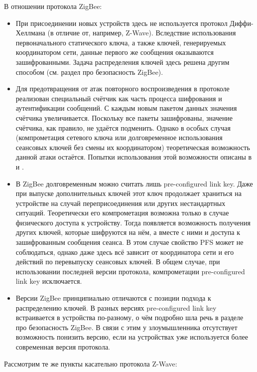 	В отношении протокола ZigBee:
	
	\begin{itemize}
		\item При присоединении новых устройств здесь не используется протокол Диффи-Хеллмана
		(в отличие от, например, Z-Wave). Вследствие использования первоначального статического
		ключа, а также ключей, генерируемых координатором сети, данные первого же сообщения
		оказываются зашифрованными. Задача распределения ключей здесь решена другим способом
		(см. раздел про безопасность ZigBee).
		\item Для предотвращения от атак повторного воспроизведения в протоколе реализован
		специальный счётчик как часть процесса шифрования и аутентификации сообщений. С каждым
		новым пакетом данных значения счётчика увеличивается. Поскольку все пакеты зашифрованы,
		значение счётчика, как правило, не удаётся подменить. Однако в особых случая (компрометация
		сетевого ключа или долговременное использования сеансовых ключей без смены их координатором)
		теоретическая возможность данной атаки остаётся. Попытки использования этой возможности
		описаны в \cite{zigbee-attacks} и \cite{zigbee-security-analysis}.
		\item В ZigBee долговременным можно считать лишь pre-configured link key. Даже при выпуске 
		дополнительных ключей этот ключ продолжает храниться на устройстве на случай переприсоединения 
		или других нестандартных ситуаций. Теоретически его компрометация возможна только в случае
		физического доступа к устройству. Тогда появляется возможность получения других ключей,
		которые шифруются на нём, а вместе с ними и доступа к зашифрованным сообщения сеанса.
		В этом случае свойство PFS может не соблюдаться, однако даже здесь всё зависит от координатора
		сети и его действий по перевыпуску сеансовых ключей. В общем случае, при использовании последней
		версии протокола, компрометации pre-configured link key исключается.
		\item Версии ZigBee принципиально отличаются с позиции подхода к распределению ключей. В разных
		версиях pre-configured link key встраивается в устройства по-разному, о чём подробно шла речь
		в разделе про безопасность ZigBee. В связи с этим у злоумышленника отсутствует возможность
		понизить версию, если на устройствах уже используется более современная версия протокола.
	\end{itemize}

	Рассмотрим те же пункты касательно протокола Z-Wave:
	
